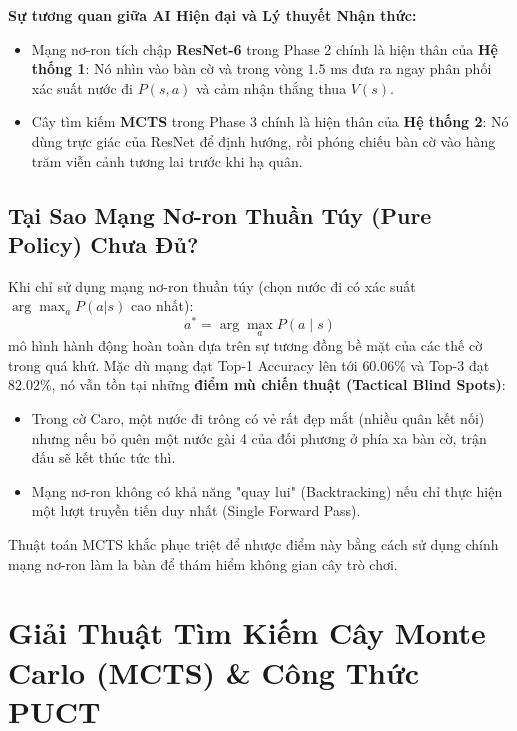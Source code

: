 \documentclass[12pt,a4paper,oneside]{report}
\begin{document}
\begin{pedagogy}
\textbf{Sự tương quan giữa AI Hiện đại và Lý thuyết Nhận thức:}
\begin{itemize}
    \item Mạng nơ-ron tích chập \textbf{ResNet-6} trong Phase 2 chính là hiện thân của \textbf{Hệ thống 1}: Nó nhìn vào bàn cờ và trong vòng $1.5\text{ ms}$ đưa ra ngay phân phối xác suất nước đi $P(s, a)$ và cảm nhận thắng thua $V(s)$.
    \item Cây tìm kiếm \textbf{MCTS} trong Phase 3 chính là hiện thân của \textbf{Hệ thống 2}: Nó dùng trực giác của ResNet để định hướng, rồi phóng chiếu bàn cờ vào hàng trăm viễn cảnh tương lai trước khi hạ quân.
\end{itemize}
\end{pedagogy}

\section{Tại Sao Mạng Nơ-ron Thuần Túy (Pure Policy) Chưa Đủ?}

Khi chỉ sử dụng mạng nơ-ron thuần túy (chọn nước đi có xác suất $\arg\max_a P(a|s)$ cao nhất):
\begin{equation}
    a^* = \arg\max_{a} P(a \mid s)
\end{equation}
mô hình hành động hoàn toàn dựa trên sự tương đồng bề mặt của các thế cờ trong quá khứ. Mặc dù mạng đạt Top-1 Accuracy lên tới $60.06\%$ và Top-3 đạt $82.02\%$, nó vẫn tồn tại những \textbf{điểm mù chiến thuật (Tactical Blind Spots)}:
\begin{itemize}
    \item Trong cờ Caro, một nước đi trông có vẻ rất đẹp mắt (nhiều quân kết nối) nhưng nếu bỏ quên một nước gài 4 của đối phương ở phía xa bàn cờ, trận đấu sẽ kết thúc tức thì.
    \item Mạng nơ-ron không có khả năng "quay lui" (Backtracking) nếu chỉ thực hiện một lượt truyền tiến duy nhất (Single Forward Pass).
\end{itemize}

Thuật toán MCTS khắc phục triệt để nhược điểm này bằng cách sử dụng chính mạng nơ-ron làm la bàn để thám hiểm không gian cây trò chơi.

\chapter{Giải Thuật Tìm Kiếm Cây Monte Carlo (MCTS) \& Công Thức PUCT}
\end{document}
